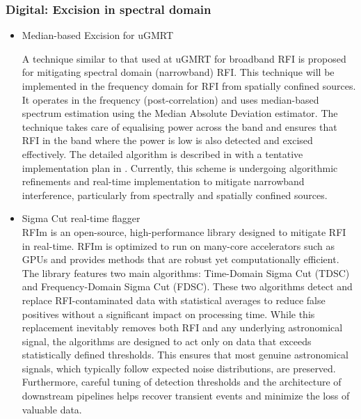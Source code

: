 \subsubsection{Digital: Excision in spectral domain}
\begin{itemize}

\item Median-based Excision for uGMRT

A technique similar to that used at uGMRT for broadband RFI is proposed for mitigating spectral domain (narrowband) RFI. This technique will be implemented in the frequency domain for RFI from spatially confined sources. It operates in the frequency (post-correlation) and uses median-based spectrum estimation using the Median Absolute Deviation estimator. The technique takes care of equalising power across the band and ensures that RFI in the band where the power is low is also detected and excised effectively. The detailed algorithm is described in \cite{buch2016towards} with a tentative implementation plan in \cite{buch2016real}. Currently, this scheme is undergoing algorithmic refinements and real-time implementation to mitigate narrowband interference, particularly from  spectrally and spatially confined sources.


\item Sigma Cut real-time flagger\\

RFIm \citep{sclocco2019real} is an open-source, high-performance library designed to mitigate RFI in real-time. RFIm is optimized to run on many-core accelerators such as GPUs and provides methods that are robust yet computationally efficient. The library features two main algorithms: Time-Domain Sigma Cut (TDSC) and Frequency-Domain Sigma Cut (FDSC). These two algorithms detect and replace RFI-contaminated data with statistical averages to reduce false positives without a significant impact on processing time.
While this replacement inevitably removes both RFI and any underlying astronomical signal, the algorithms are designed to act only on data that exceeds statistically defined thresholds. This ensures that most genuine astronomical signals, which typically follow expected noise distributions, are preserved. Furthermore, careful tuning of detection thresholds and the architecture of downstream pipelines helps recover transient events and minimize the loss of valuable data.


\end{itemize}
